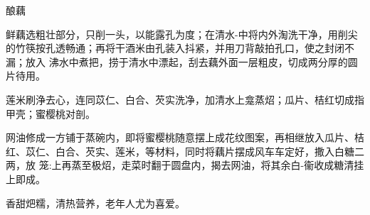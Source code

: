 \begin{recipe}[八宝酿藕]{酿藕}

\ingredients


\preparation

\step 鲜藕选粗壮部分，只削一头，以能露孔为度；在清水-中将内外淘洗干净，用削尖
的竹筷按孔透畅通；再将干酒米由孔装入抖紧，并用刀背敲拍孔口，使之封闭不漏；放入
沸水中煮把，捞于清水中漂起，刮去藕外面一层粗皮，切成两分厚的圆片待用。

\step 莲米刷浄去心，连同苡仁、白合、芡实洗净，加清水上龛蒸炤；瓜片、桔红切成指
甲壳；蜜樱桃对剖。

\step 网油修成一方铺于蒸碗内，即将蜜樱桃随意摆上成花纹图案，再相继放入瓜片、桔
红、苡仁、白合、芡实、莲米，等材料，同时将藕片摆成风车车定好，撒入白糖二两，放
笼:上再蒸至极炤，走菜时翻于圆盘内，揭去网油，将其余白-衞收成糖清挂上即成。

\features

香甜𤆵糯，清热营养，老年人尤为喜爱。

\end{recipe}

